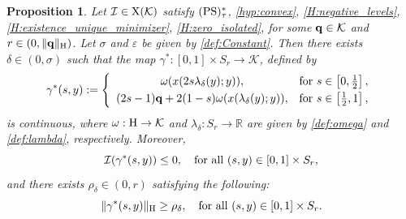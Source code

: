 \documentclass{article}
\newcommand{\boK}{\mathcal{K}}
\newcommand{\boI}{\mathcal{I}}
\newcommand{\R}{\mathbb{R}}
\newcommand{\Hilb}{{\textnormal H}}
\newcommand{\minq}{{\bf q}}
\newcommand{\X}{{\textnormal X}}
\newcommand{\PS}{(\textnormal{PS})^{*}_\tau}
\newtheorem{proposition}{Proposition}[section]
\theoremstyle{definition}
\begin{document}
\begin{proposition}\label{Pro:Gamma}
Let $\boI\in\X(\boK)$ satisfy $\PS$, \eqref{hyp:convex}, \eqref{H:negative_levels}, \eqref{H:existence_unique_minimizer}, \eqref{H:zero_isolated}, for some $\minq\in\boK$ and $r\in(0,\|\minq\|_\Hilb)$. Let $\sigma$ and $\varepsilon$ be given by \eqref{def:Constant}. Then there exists $\delta\in(0,\sigma)$ such that the map $\gamma^*:[0,1]\times S_r\to\boK$, defined by
\begin{equation}\label{def:gamma*}
    \gamma^*(s,y):=\left\{\begin{array}{cl}
         \omega(x(2s\lambda_\delta(y);y)),&\hbox{for }s\in\left[0,\tfrac{1}{2}\right],  \vspace{1mm} \\ 
         (2s-1)\minq+2(1-s)\omega(x(\lambda_\delta(y);y)),&\hbox{for } s\in\left[\tfrac{1}{2},1\right],
    \end{array}\right.
\end{equation}    
is continuous, where $\omega:\Hilb\to\boK$ and $\lambda_\delta:S_r\to\R$ are given by \eqref{def:omega} and \eqref{def:lambda}, respectively. Moreover,
\begin{equation}
\label{eq:gamma-negativeflow}
    \boI(\gamma^*(s,y))\leq0,\quad  \hbox{for all }(s,y)\in[0,1]\times S_r,
\end{equation}and there exists $\rho_\delta\in (0,r)$ satisfying the following:
\begin{equation}\label{eq:gamma-notzero}
    \|\gamma^*(s,y)\|_\Hilb\geq \rho_\delta,\quad \hbox{for all }(s,y)\in[0,1]\times S_r.
\end{equation}
\end{proposition}
\end{document}
